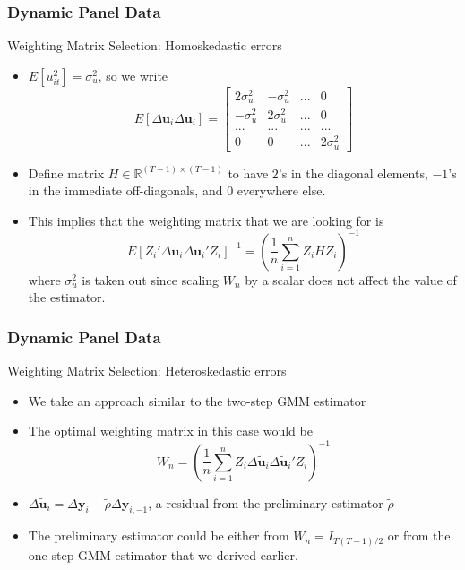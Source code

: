 \documentclass{beamer}
\begin{document}
\begin{frame}
\frametitle{Dynamic Panel Data}
Weighting Matrix Selection: Homoskedastic errors
\begin{itemize}
\item $E[u_{it}^2]=\sigma_u^2$, so we write
\[
E[\Delta \mathbf{u}_i \Delta \mathbf{u}_i]=\begin{bmatrix}2\sigma_u^2& -\sigma_u^2 &... &0\\ -\sigma_u^2 & 2\sigma_u^2 & ... &0 \\ ...&...&...&...\\ 0 & 0 & ... & 2\sigma_u^2\end{bmatrix}
\]
\item Define matrix $H\in\mathbb{R}^{(T-1)\times(T-1)}$ to have $2$'s in the diagonal elements, $-1$'s in the immediate off-diagonals, and $0$ everywhere else. 
\item This implies that the weighting matrix that we are looking for is
\[
E[Z_i'\Delta \mathbf{u}_i \Delta \mathbf{u}_i'Z_i]^{-1}=\left(\frac{1}{n}\sum_{i=1}^nZ_iH Z_i\right)^{-1}
\]
where $\sigma_u^2$ is taken out since scaling $W_n$ by a scalar does not affect the value of the estimator.
\end{itemize}
\end{frame}

\begin{frame}
\frametitle{Dynamic Panel Data}
Weighting Matrix Selection: Heteroskedastic errors
\begin{itemize}
\item We take an approach similar to the two-step GMM estimator
\item The optimal weighting matrix in this case would be
\[
W_n=\left(\frac{1}{n}\sum_{i=1}^nZ_i\Delta\tilde{\mathbf{u}}_i \Delta\tilde{\mathbf{u}}_i' Z_i\right)^{-1} 
\]
\item $\Delta\tilde{\mathbf{u}}_i=\Delta \mathbf{y}_ i -\tilde{\rho}\Delta \mathbf{y}_{i,-1}$, a residual from the preliminary estimator $\tilde{\rho}$
\item The preliminary estimator could be either from $W_n = I_{T(T-1)/2}$ or from the one-step GMM estimator that we derived earlier. 
\end{itemize}
\end{frame}
\end{document}
